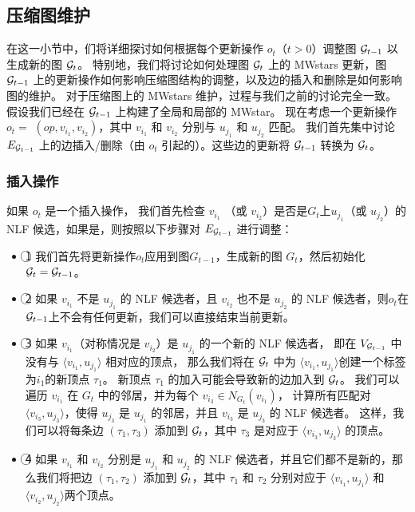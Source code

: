 \subsection{压缩图维护}
在这一小节中，们将详细探讨如何根据每个更新操作 $o_t$（$t>0$）调整图 $\mathcal{G}_{t-1}$ 以生成新的图 $\mathcal{G}_t$。
特别地，我们将讨论如何处理图 $\mathcal{G}_t$ 上的 MWstars 更新，图 $\mathcal{G}_{t-1}$ 上的更新操作如何影响压缩图结构的调整，以及边的插入和删除是如何影响图的维护。
对于压缩图上的 MWstars 维护，过程与我们之前的讨论完全一致。
假设我们已经在 $\mathcal{G}_{t-1}$ 上构建了全局和局部的 MWstar。
现在考虑一个更新操作 $o_t=$ $(op, v_{i_1}, v_{i_2})$，其中 $v_{i_1}$ 和 $v_{i_2}$ 分别与 $u_{j_1}$ 和 $u_{j_2}$ 匹配。
%
我们首先集中讨论 $E_{\mathcal{G}_{t-1}}$ 上的边插入/删除（由 $o_t$ 引起的）。这些边的更新将 $\mathcal{G}_{t-1}$ 转换为 $\mathcal{G}_t$。

\subsubsection{插入操作}
如果 $o_t$ 是一个插入操作，
我们首先检查 $v_{i_1}$ （或 $v_{i_2}$）是否是$G_t$上$u_{j_1}$（或 $u_{j_2}$）的 NLF 候选，如果是，则按照以下步骤对 $E_{\mathcal{G}_{t-1}}$ 进行调整：
\begin{itemize}
\item \textcircled{1} 我们首先将更新操作$o_t$应用到图$G_{t-1}$，生成新的图 $G_t$，然后初始化 $\mathcal{G}_t = \mathcal{G}_{t-1}$。
\item \textcircled{2} 如果 $v_{i_1}$ 不是 $u_{j_1}$ 的 NLF 候选者，且 $v_{i_2}$ 也不是 $u_{j_2}$ 的 NLF 候选者，则$o_t$在$\mathcal{G}_{t-1}$上不会有任何更新，我们可以直接结束当前更新。
\item \textcircled{3} 如果 $v_{i_1}$（对称情况是 $v_{i_2}$）是 $u_{j_1}$ 的一个新的 NLF 候选者，
即在 $V_{\mathcal{G}_{t-1}}$ 中没有与 $\langle v_{i_1}, u_{j_1} \rangle$ 相对应的顶点，
那么我们将在 $\mathcal{G}_t$ 中为 $\langle v_{i_1}, u_{j_1} \rangle$创建一个标签为$i_1$的新顶点 $\tau_1$。
新顶点 $\tau_1$ 的加入可能会导致新的边加入到 $\mathcal{G}_t$。
我们可以遍历 $v_{i_1}$ 在 $G_t$ 中的邻居，并为每个 $v_{i_3}\in N_{G_t}(v_{i_1})$，
计算所有匹配对 $\langle v_{i_3}, u_{j_3} \rangle$，使得 $u_{j_3}$ 是 $u_{j_1}$ 的邻居，并且 $v_{i_3}$ 是 $u_{j_3}$ 的 NLF 候选者。
这样，我们可以将每条边 $(\tau_1, \tau_3)$ 添加到 $\mathcal{G}_t$，其中 $\tau_3$ 是对应于 $\langle v_{i_3}, u_{j_3} \rangle$ 的顶点。
\item \textcircled{4} 如果 $v_{i_1}$ 和 $v_{i_2}$ 分别是 $u_{j_1}$ 和 $u_{j_2}$ 的 NLF 候选者，并且它们都不是新的，那么我们将把边 $(\tau_1, \tau_2)$ 添加到 $\mathcal{G}_t$，其中 $\tau_1$ 和 $\tau_2$ 分别对应于 $\langle v_{i_1}, u_{j_1} \rangle$ 和 $\langle v_{i_2}, u_{j_2} \rangle$两个顶点。
\end{itemize}

